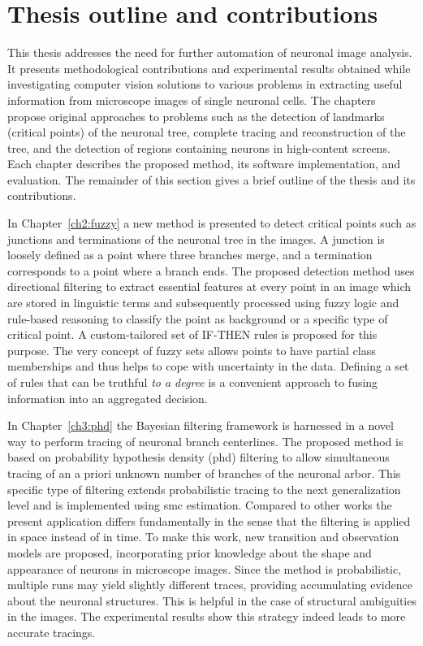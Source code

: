 \section{Thesis outline and contributions}
\label{sec:outline}
This thesis addresses the need for further automation of neuronal image analysis. It presents methodological contributions and experimental results obtained while investigating computer vision solutions to various problems in extracting useful information from microscope images of single neuronal cells. The chapters propose original approaches to problems such as the detection of landmarks (critical points) of the neuronal tree, complete tracing and reconstruction of the tree, and the detection of regions containing neurons in high-content screens. Each chapter describes the proposed method, its software implementation, and evaluation. The remainder of this section gives a brief outline of the thesis and its contributions.

In Chapter~\ref{ch2:fuzzy} a new method is presented to detect critical points such as junctions and terminations of the neuronal tree in the images. A junction is loosely defined as a point where three branches merge, and a termination corresponds to a point where a branch ends. The proposed detection method uses directional filtering to extract essential features at every point in an image which are stored in linguistic terms and subsequently processed using fuzzy logic and rule-based reasoning to classify the point as background or a specific type of critical point. A custom-tailored set of IF-THEN rules is proposed for this purpose. The very concept of fuzzy sets allows points to have partial class memberships and thus helps to cope with uncertainty in the data. Defining a set of rules that can be truthful \textit{to a degree} is a convenient approach to fusing information into an aggregated decision.

In Chapter~\ref{ch3:phd} the Bayesian filtering framework is harnessed in a novel way to perform tracing of neuronal branch centerlines. The proposed method is based on probability hypothesis density (\gls{phd}) filtering to allow simultaneous tracing of an a priori unknown number of branches of the neuronal arbor. This specific type of filtering extends probabilistic tracing to the next generalization level and is implemented using \gls{smc} estimation. Compared to other works the present application differs fundamentally in the sense that the filtering is applied in space instead of in time. To make this work, new transition and observation models are proposed, incorporating prior knowledge about the shape and appearance of neurons in microscope images. Since the method is probabilistic, multiple runs may yield slightly different traces, providing accumulating evidence about the neuronal structures. This is helpful in the case of structural ambiguities in the images. The experimental results show this strategy indeed leads to more accurate tracings.

